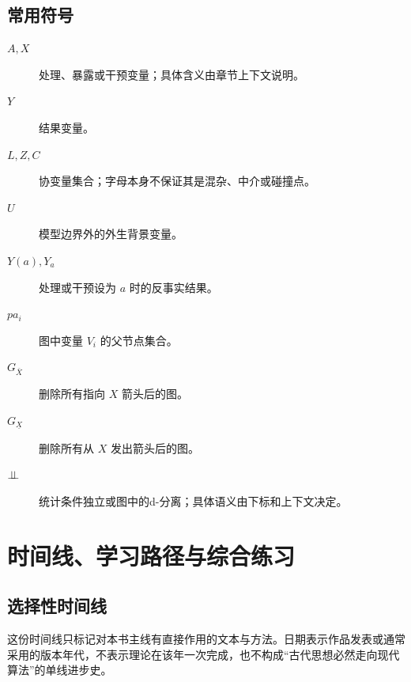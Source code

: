 \subsection{常用符号}

\begin{description}
  \item[$A,X$] 处理、暴露或干预变量；具体含义由章节上下文说明。
  \item[$Y$] 结果变量。
  \item[$L,Z,C$] 协变量集合；字母本身不保证其是混杂、中介或碰撞点。
  \item[$U$] 模型边界外的外生背景变量。
  \item[$Y(a),Y_a$] 处理或干预设为 $a$ 时的反事实结果。
  \item[$pa_i$] 图中变量 $V_i$ 的父节点集合。
  \item[$G_{\bar X}$] 删除所有指向 $X$ 箭头后的图。
  \item[$G_{\underline X}$] 删除所有从 $X$ 发出箭头后的图。
  \item[$\mathrel{\perp\!\!\!\perp}$] 统计条件独立或图中的d-分离；具体语义由下标和上下文决定。
\end{description}

\section{时间线、学习路径与综合练习}

\subsection{选择性时间线}

这份时间线只标记对本书主线有直接作用的文本与方法。日期表示作品发表或通常采用的版本年代，不表示理论在该年一次完成，也不构成“古代思想必然走向现代算法”的单线进步史。

